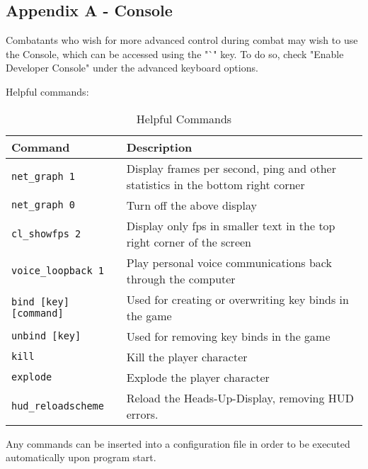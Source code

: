 \subsection{Appendix A - Console}
\label{Appendix_A_Console}
Combatants who wish for more advanced control during combat may wish to use the Console, which can be accessed using the "`" key. To do so, check "Enable Developer Console" under the advanced keyboard options.

Helpful commands:
\begin{table}[h!b!p!]
\caption{Helpful Commands}
\begin{tabular}{|l|p{10.5cm}|}
	\hline
		Command & Description\\
	\hline
	\texttt{net\_graph 1}&Display frames per second, ping and other statistics in the bottom right corner\\
	\texttt{net\_graph 0}&Turn off the above display\\
	\texttt{cl\_showfps 2}&Display only fps in smaller text in the top right corner of the screen\\
	\texttt{voice\_loopback 1}&Play personal voice communications back through the computer\\
	\texttt{bind [key] [command]}&Used for creating or overwriting key binds in the game\\
	\texttt{unbind [key]}&Used for removing key binds in the game\\
	\texttt{kill}&Kill the player character\\
	\texttt{explode}&Explode the player character\\
	\texttt{hud\_reloadscheme}&Reload the Heads-Up-Display, removing HUD errors.\\
  	\hline
\end{tabular}
\label{table_common_actions}
\end{table}


Any commands can be inserted into a configuration file in order to be executed automatically upon program start.